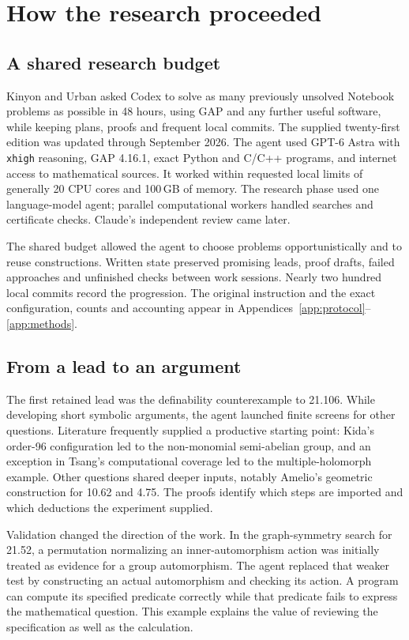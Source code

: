 \section{How the research proceeded}
\label{sec:methods}
\label{sec:trajectory}

\subsection{A shared research budget}

Kinyon and Urban asked Codex to solve as many previously unsolved Notebook
problems as possible in 48 hours, using GAP and any further useful
software, while keeping plans, proofs and frequent local commits.
The supplied twenty-first edition was updated through September 2026.
The agent used GPT-6 Astra with \texttt{xhigh} reasoning, GAP 4.16.1,
exact Python and C/C++ programs, and internet access to mathematical
sources. It worked within requested local limits of generally 20 CPU
cores and 100\,GB of memory. The research phase used one language-model
agent; parallel computational workers handled searches and certificate
checks. Claude's independent review came later.

The shared budget allowed the agent to choose problems opportunistically
and to reuse constructions. Written state preserved promising leads,
proof drafts, failed approaches and unfinished checks between work
sessions. Nearly two hundred local commits record the progression.
The original instruction and the exact configuration, counts and
accounting appear in Appendices~\ref{app:protocol}--\ref{app:methods}.

\subsection{From a lead to an argument}

The first retained lead was the definability counterexample to 21.106.
While developing short symbolic arguments, the agent launched finite
screens for other questions. Literature frequently supplied a productive
starting point: Kida's order-96 configuration led to the non-monomial
semi-abelian group, and an exception in Tsang's computational coverage
led to the multiple-holomorph example. Other questions shared deeper
inputs, notably Amelio's geometric construction for 10.62 and 4.75.
The proofs identify which steps are imported and which deductions the
experiment supplied.

Validation changed the direction of the work. In the graph-symmetry
search for 21.52, a permutation normalizing an inner-automorphism action
was initially treated as evidence for a group automorphism. The agent
replaced that weaker test by constructing an actual automorphism and
checking its action. A program can compute its specified predicate
correctly while that predicate fails to express the mathematical question.
This example explains the value of reviewing the specification as well
as the calculation.

